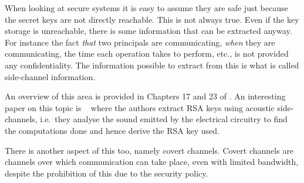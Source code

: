 When looking at secure systems it is easy to assume they are safe just because 
the secret keys are not directly reachable.
This is not always true.
Even if the key storage is unreachable, there is some information that can be 
extracted anyway.
For instance the fact \emph{that} two principals are communicating, \emph{when} 
they are communicating, the time each operation takes to perform, etc., is not 
provided any confidentiality.
The information possible to extract from this is what is called side-channel 
information.

An overview of this area is provided in Chapters 17 and 23 of 
\cite{Anderson2008sea}.
An interesting paper on this topic is 
~\cite{genkin2013rsa} where the authors extract RSA 
keys using acoustic side-channels, i.e.~they analyse the sound emitted by the 
electrical circuitry to find the computations done and hence derive the RSA key 
used.

There is another aspect of this too, namely covert channels.
Covert channels are channels over which communication can take place, even with 
limited bandwidth, despite the prohibition of this due to the security policy.

